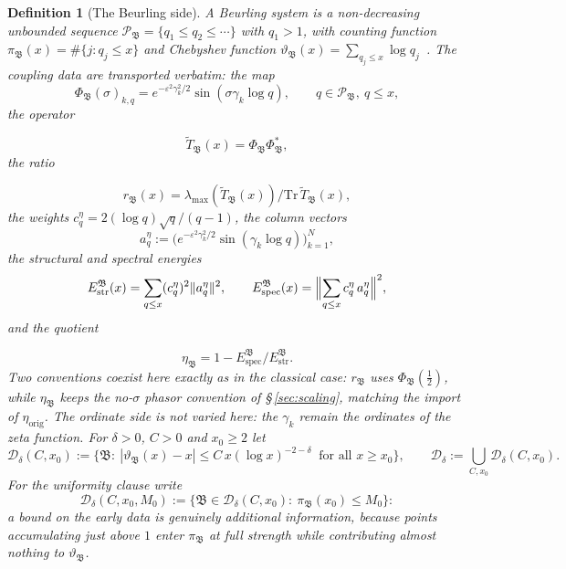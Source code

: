 \documentclass[11pt]{article}
\newtheorem{definition}[theorem]{Definition}
\newcommand{\Tt}{\widetilde{T}}
\newcommand{\Dclass}{\mathcal{D}_\delta}        %
\begin{document}
\begin{definition}[The Beurling side]
\label{def:beurling}
A \emph{Beurling system} is a non-decreasing unbounded sequence
$\mathcal{P}_{\mathfrak{B}}=\{q_1\le q_2\le\cdots\}$ with $q_1>1$, with counting function
$\pi_{\mathfrak{B}}(x)=\#\{j:q_j\le x\}$ and Chebyshev function
$\vartheta_{\mathfrak{B}}(x)=\sum_{q_j\le x}\log q_j$~\cite{Beurling37,DiamondZhang16}. The
coupling data are transported verbatim: the map
\[
\Phi_{\mathfrak{B}}(\sigma)_{k,q}=e^{-\varepsilon^2\gamma_k^2/2}\sin(\sigma\gamma_k\log q),
\qquad q\in\mathcal{P}_{\mathfrak{B}},\ q\le x,
\]
the operator

\[
\Tt_{\mathfrak{B}}(x)=\Phi_{\mathfrak{B}}\Phi_{\mathfrak{B}}^{*},
\]
 the ratio

\[
r_{\mathfrak{B}}(x)=\lambda_{\max}(\Tt_{\mathfrak{B}}(x))/\mathrm{Tr}\,\Tt_{\mathfrak{B}}(x),
\]
 the weights
$c_q^{\eta}=2(\log q)\sqrt{q}/(q-1)$, the column vectors
\[
a_q^{\eta}:=\bigl(e^{-\varepsilon^2\gamma_k^2/2}\sin(\gamma_k\log q)\bigr)_{k=1}^{N},
\]
the structural and spectral energies
\[
E^{\mathfrak{B}}_{\mathrm{str}}(x)=\sum_{q\le x}(c_q^{\eta})^2\|a_q^{\eta}\|^2,
\qquad
E^{\mathfrak{B}}_{\mathrm{spec}}(x)=\Bigl\|\sum_{q\le x}c_q^{\eta}\,a_q^{\eta}\Bigr\|^2,
\]
 and the quotient

\[
\eta_{\mathfrak{B}}=1-E^{\mathfrak{B}}_{\mathrm{spec}}/E^{\mathfrak{B}}_{\mathrm{str}}.
\]
 Two conventions coexist
here exactly as in the classical case: $r_{\mathfrak{B}}$ uses $\Phi_{\mathfrak{B}}(\tfrac12)$, while
$\eta_{\mathfrak{B}}$ keeps the no-$\sigma$ phasor convention of \S\,\ref{sec:scaling},
matching the import of $\eta_{\mathrm{orig}}$. The ordinate side is not
varied here: the $\gamma_k$ remain the ordinates of the zeta function.
For $\delta>0$, $C>0$ and $x_0\ge 2$ let
\[
\Dclass(C,x_0):=\bigl\{\mathfrak{B}:\ |\vartheta_{\mathfrak{B}}(x)-x|\le C\,x(\log x)^{-2-\delta}
\ \text{ for all } x\ge x_0\bigr\},
\qquad
\Dclass:=\bigcup_{C,x_0}\Dclass(C,x_0).
\]
For the uniformity clause write
\[
\Dclass(C,x_0,M_0):=\bigl\{\mathfrak{B}\in\Dclass(C,x_0):\ \pi_{\mathfrak{B}}(x_0)\le M_0\bigr\}:
\]
a bound on the early data is genuinely additional information, because points
accumulating just above $1$ enter $\pi_{\mathfrak{B}}$ at full strength while contributing
almost nothing to $\vartheta_{\mathfrak{B}}$.
\end{definition}
\end{document}
